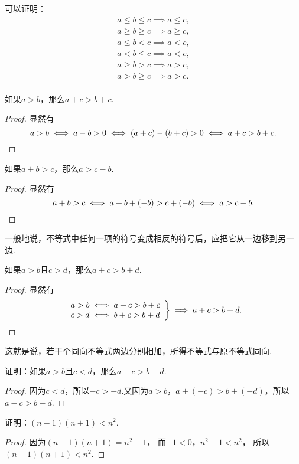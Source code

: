 可以证明：\begin{gather*}
	a \leq b \leq c \implies a \leq c, \\
	a \geq b \geq c \implies a \geq c, \\
	a \leq b < c \implies a < c, \\
	a < b \leq c \implies a < c, \\
	a \geq b > c \implies a > c, \\
	a > b \geq c \implies a > c. \\
\end{gather*}

\begin{theorem}
如果\(a>b\)，那么\(a+c>b+c\).
\begin{proof}
显然有\[
	a>b
	\iff a-b>0
	\iff (a+c)-(b+c)>0
	\iff a+c>b+c.
	\qedhere
\]
\end{proof}
\end{theorem}

\begin{corollary}
如果\(a+b>c\)，那么\(a>c-b\).
\begin{proof}
显然有\[
a+b>c
\iff a+b+(-b)>c+(-b)
\iff a>c-b.
\qedhere
\]
\end{proof}
\end{corollary}
一般地说，不等式中任何一项的符号变成相反的符号后，应把它从一边移到另一边.

\begin{corollary}
如果\(a>b\)且\(c>d\)，那么\(a+c>b+d\).
\begin{proof}
显然有\[
\left. \begin{array}{c}
a>b \iff a+c>b+c \\
c>d \iff b+c>b+d
\end{array} \right\}
\implies a+c>b+d.
\qedhere
\]
\end{proof}
\end{corollary}
这就是说，若干个同向不等式两边分别相加，所得不等式与原不等式同向.

\begin{example}
证明：如果\(a > b\)且\(c < d\)，那么\(a - c > b - d\).
\begin{proof}
因为\(c < d\)，所以\(-c > -d\).又因为\(a > b\)，\(a + (-c) > b + (-d)\)，所以\(a - c > b - d\).
\end{proof}
\end{example}

\begin{example}
证明：\((n-1)(n+1)<n^2\).
\begin{proof}
因为\((n-1)(n+1)=n^2-1\)，
而\(-1<0\)，\(n^2-1<n^2\)，
所以\((n-1)(n+1)<n^2\).
\end{proof}
\end{example}

